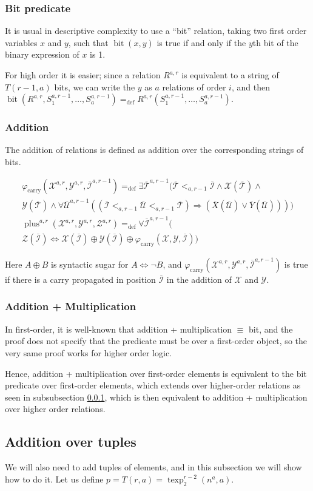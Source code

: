 \documentclass[a4paper,12pt]{article}
\newcommand{\sss}[1]{\subsubsection{#1}}
\theoremstyle{definition}
\DeclareMathOperator{\texp}{texp}
\renewcommand{\phi}{\varphi}
\DeclareMathOperator{\bit}{bit}
\DeclareMathOperator{\plu}{plus}
\newcommand{\mc}{\mathcal}
\newcommand{\ol}{\overline}
\newcommand{\olmc}[1]{\overline{\mathcal{#1}}}
\newcommand{\ed}{=_{\mathrm{def}}}
\begin{document}
\sss{Bit predicate}\label{bit}
It is usual in descriptive complexity to use a ``bit'' relation,
taking two first order variables $x$ and $y$, such that $\bit(x,y)$ is
true if and only if the $y$th bit of the binary expression of $x$ is
1.


For high order it is easier; since a relation $R^{a,r}$ is equivalent
to a string of $T(r-1,a)$ bits, we can write the $y$ as $a$ relations
of order $i$, and then
\\$\bit(R^{a,r},S_1^{a,r-1},\dots,S_a^{a,r-1})\ed
R^{a,r}(S_1^{a,r-1},\dots,S_a^{a,r-1})$.

\sss{Addition}

The addition of relations is defined as addition over the
corresponding strings of bits.

\begin{eqnarray}
  \phi_{\mathrm{carry}}(\mc X^{a,r},\mc Y^{a,r},\olmc I^{a,r-1})\ed\exists\olmc T^{a,r-1}( \olmc T<_{a,r-1}\olmc I\land\mc X(\olmc T)\land\nonumber  \\\mc Y(\olmc T)\land
  \forall \olmc U^{a,r-1}((\olmc I<_{a,r-1}\olmc U<_{a,r-1}\olmc T)\Rightarrow (\ol X(\olmc U)\lor \ol Y(\olmc U))))  \\
  \plu^{a,r}(\mc X^{a,r},\mc Y^{a,r},\mc Z^{a,r})\ed\forall \olmc{I}^{a,r-1}(\nonumber  \\\mc Z(\olmc I)\Leftrightarrow \mc X(\olmc I)\oplus\mc Y(\olmc I)\oplus\phi_\mathrm{carry}(\mc X,\mc Y,\olmc I))
\end{eqnarray} 

Here $A\oplus B$ is syntactic sugar for $A\Leftrightarrow \neg B$, and
$\phi_{\mathrm{carry}}(\mc X^{a,r},\mc Y^{a,r},\olmc I^{a,r-1})$ is
true if there is a carry propagated in position $\olmc I$ in the
addition of $\mc X$ and $\mc Y$.



\sss{Addition + Multiplication}
In first-order, it is well-known that addition + multiplication
$\equiv$ bit, and the proof does not specify that the predicate must
be over a first-order object, so the very same proof works for higher
order logic.

Hence, addition + multiplication over first-order elements is
equivalent to the bit predicate over first-order elements, which
extends over higher-order relations as seen in subsubsection
\ref{bit}, which is then equivalent to addition + multiplication over
higher order relations.

\subsection{Addition over tuples}
We will also need to add tuples of elements, and in this subsection we
will show how to do it. Let us define $p=T(r,a)=\texp_2^{r-2}(n^a,a)$.
\end{document}
